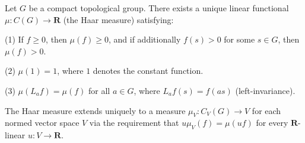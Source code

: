 Let $G$ be a compact topological group. There exists a unique linear functional $\mu: C(G) \to \mathbf{R}$ (the Haar measure) satisfying:

(1) If $f \geq 0$, then $\mu(f) \geq 0$, and if additionally $f(s) > 0$ for some $s \in G$, then $\mu(f) > 0$.

(2) $\mu(1) = 1$, where $1$ denotes the constant function.

(3) $\mu(L_a f) = \mu(f)$ for all $a \in G$, where $L_a f(s) = f(as)$ (left-invariance).

The Haar measure extends uniquely to a measure $\mu_V: C_V(G) \to V$ for each normed vector space $V$ via the requirement that $u \mu_V(f) = \mu(u f)$ for every $\mathbf{R}$-linear $u: V \to \mathbf{R}$.
